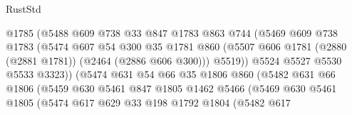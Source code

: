\begin{lexlean}{RustStd}
\begin{coremodule}
                                @1785
                                (@5488
                                  @609
                                  @738
                                  @33
                                  @847
                                  @1783
                                  @863
                                  @744
                                  (@5469
                                    @609
                                    @738
                                    @1783
                                    (@5474
                                      @607
                                      @54
                                      @300
                                      @35
                                      @1781
                                      @860
                                      (@5507
                                        @606
                                        @1781
                                        (@2880 (@2881 @1781))
                                        (@2464 (@2886 @606 @300)))
                                      @5519))
                                  @5524
                                  @5527
                                  @5530
                                  @5533
                                  @3323))
                              (@5474
                                @631
                                @54
                                @66
                                @35
                                @1806
                                @860
                                (@5482
                                  @631
                                  @66
                                  @1806
                                  (@5459
                                    @630
                                    @5461
                                    @847
                                    @1805
                                    @1462
                                    @5466
                                    (@5469
                                      @630
                                      @5461
                                      @1805
                                      (@5474
                                        @617
                                        @629
                                        @33
                                        @198
                                        @1792
                                        @1804
                                        (@5482
                                          @617

\end{coremodule}
\end{lexlean}
